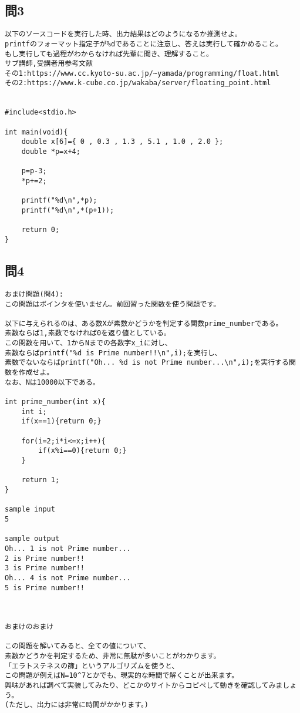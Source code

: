 \subsection{問3}
\begin{verbatim}
以下のソースコードを実行した時、出力結果はどのようになるか推測せよ。
printfのフォーマット指定子が%dであることに注意し、答えは実行して確かめること。
もし実行しても過程がわからなければ先輩に聞き、理解すること。
サブ講師,受講者用参考文献
その1:https://www.cc.kyoto-su.ac.jp/~yamada/programming/float.html
その2:https://www.k-cube.co.jp/wakaba/server/floating_point.html


#include<stdio.h>

int main(void){
	double x[6]={ 0 , 0.3 , 1.3 , 5.1 , 1.0 , 2.0 };
	double *p=x+4;
	
	p=p-3;
	*p+=2;
	
	printf("%d\n",*p);
	printf("%d\n",*(p+1));
	
	return 0;
}
\end{verbatim}

\subsection{問4}
\begin{verbatim}
おまけ問題(問4):
この問題はポインタを使いません。前回習った関数を使う問題です。

以下に与えられるのは、ある数Xが素数かどうかを判定する関数prime_numberである。
素数ならば1,素数でなければ0を返り値としている。
この関数を用いて、1からNまでの各数字x_iに対し、
素数ならばprintf("%d is Prime number!!\n",i);を実行し、
素数でないならばprintf("Oh... %d is not Prime number...\n",i);を実行する関数を作成せよ。
なお、Nは10000以下である。

int prime_number(int x){
	int i;
	if(x==1){return 0;}
	
	for(i=2;i*i<=x;i++){
		if(x%i==0){return 0;}
	}
	
	return 1;
}

sample input
5

sample output
Oh... 1 is not Prime number...
2 is Prime number!!
3 is Prime number!!
Oh... 4 is not Prime number...
5 is Prime number!!



おまけのおまけ

この問題を解いてみると、全ての値について、
素数かどうかを判定するため、非常に無駄が多いことがわかります。
「エラトステネスの篩」というアルゴリズムを使うと、
この問題が例えばN=10^7とかでも、現実的な時間で解くことが出来ます。
興味があれば調べて実装してみたり、どこかのサイトからコピペして動きを確認してみましょう。
(ただし、出力には非常に時間がかかります。)
\end{verbatim}
